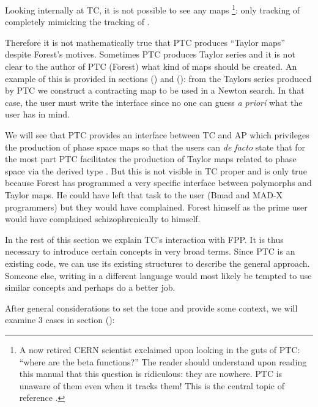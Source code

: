\documentclass{hitec}     %
\begin{document}
 Looking internally at TC, it is not possible to see any maps \footnote{A now retired CERN scientist exclaimed upon looking in the guts of PTC: ``where are the beta functions?'' The reader should understand upon reading this manual that this question  is ridiculous: they are nowhere. PTC is unaware of them even when it tracks them! This is the central topic of reference \cite{thenewbook}.}: only tracking of  completely mimicking the tracking of .
 
 
Therefore it  is not mathematically true that PTC produces ``Taylor maps'' despite Forest's motives. Sometimes PTC produces Taylor series and it is not clear to the author of PTC (Forest) what kind of maps should be created. An example of this is provided in sections () and (): from the Taylors series produced by PTC we construct a contracting map to be used in a Newton search. In that case, the user must write the interface since no one can guess {\it a priori} what the user has in mind.

 We will see that PTC provides an interface between TC and AP which privileges the production of phase space maps so that the users can {\it de facto} state that for the most part PTC facilitates the production of Taylor maps related to phase space via the derived type . But this is not visible in TC proper and is only true because Forest has programmed a very specific interface between polymorphs and Taylor maps. He could have left that task to the user (Bmad and MAD-X programmers) but they would have complained. Forest himself as the prime user would have complained schizophrenically to himself.
 
 



In the rest of this section we explain TC's interaction with FPP.  It is thus necessary to introduce certain concepts in very broad terms. Since PTC is an existing code, we can use its existing structures to describe the general approach. Someone else, writing in a different language would most likely be tempted to use similar concepts and perhaps do a better job.

After general considerations to set the tone and provide some context, we will examine 3 cases in section ():
\end{document}
